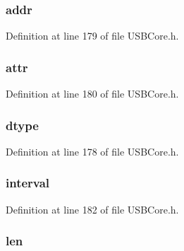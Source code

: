 \subsubsection[{addr}]{ addr}\label{struct_endpoint_descriptor_a7394c0f7cac587defeae4e84d34fb535}


Definition at line 179 of file U\+S\+B\+Core.\+h.

\hypertarget{struct_endpoint_descriptor_a76705b0f72861d4d0bef909f56fb34ec}{}
\subsubsection[{attr}]{ attr}\label{struct_endpoint_descriptor_a76705b0f72861d4d0bef909f56fb34ec}


Definition at line 180 of file U\+S\+B\+Core.\+h.

\hypertarget{struct_endpoint_descriptor_a0bb419531ec75697e63e9109fecf81b0}{}
\subsubsection[{dtype}]{ dtype}\label{struct_endpoint_descriptor_a0bb419531ec75697e63e9109fecf81b0}


Definition at line 178 of file U\+S\+B\+Core.\+h.

\hypertarget{struct_endpoint_descriptor_a10a5b8a25e61bd366aeabe4da95b2cf2}{}
\subsubsection[{interval}]{ interval}\label{struct_endpoint_descriptor_a10a5b8a25e61bd366aeabe4da95b2cf2}


Definition at line 182 of file U\+S\+B\+Core.\+h.

\hypertarget{struct_endpoint_descriptor_afbf3f3230446569534d5f466aaf4c23b}{}
\subsubsection[{len}]{ len}\label{struct_endpoint_descriptor_afbf3f3230446569534d5f466aaf4c23b}


